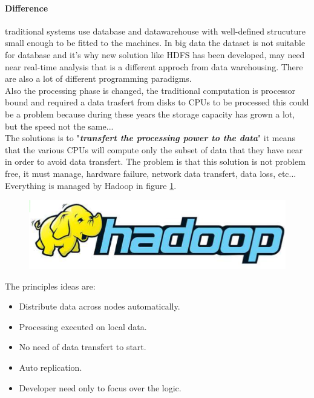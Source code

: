 \documentclass[12pt]{article}
\begin{document}
\paragraph{Difference} traditional systems use database and datawarehouse with well-defined strucuture small enough to be fitted to the machines. In big data the dataset is not suitable for database and it's why new solution like HDFS has been developed, may need near real-time analysis that is a different approch from data warehousing. There are also a lot of different programming paradigms.\\
Also the processing phase is changed, the traditional computation is processor bound and required a data trasfert from disks to CPUs to be processed this could be a problem because during these years the storage capacity has grown a lot, but the speed not the same...\\
The solutions is to "\textit{\textbf{transfert the processing power to the data}}" it means that the various CPUs will compute only the subset of data that they have near in order to avoid data transfert. The problem is that this solution is not problem free, it must manage, hardware failure, network data transfert, data loss, etc... Everything is managed by Hadoop in figure \ref{fig:hadoop}.
\begin{figure}[hp!]
  \includegraphics[width=\linewidth]{images/hadoop.png}
  \label{fig:hadoop}
\end{figure}
The principles ideas are:
\begin{itemize}
  \item Distribute data across nodes automatically.
  \item Processing executed on local data.
  \item No need of data transfert to start.
  \item Auto replication.
  \item Developer need only to focus over the logic.
\end{itemize}
\end{document}
